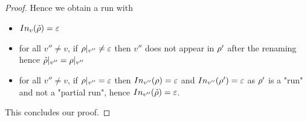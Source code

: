 \begin{proof}
	Hence we obtain a run with 
	\begin{itemize}		
		\item $\vinput{v}{\Tilde{\run}} = \varepsilon$ 
		
		\item for all $v'' \neq v$, if ${\rho}|_{v''} \neq \varepsilon$ then $v''$ does not appear in $\rho'$ after the renaming hence ${\Tilde{\rho}}|_{v''} = {\rho}|_{v''}$
		
		\item for all $v'' \neq v$, if ${\rho}|_{v''} = \varepsilon$ then $\vinput{v''}{\run} = \varepsilon$ and $\vinput{v''}{\run'} = \varepsilon$ as $\rho'$ is a "run" and not a "partial run", hence $\vinput{v''}{\Tilde{\run}} = \varepsilon$.
	\end{itemize}
	This concludes our proof.
\end{proof}

%	
%	
%	
%	
%		
%		
%		

